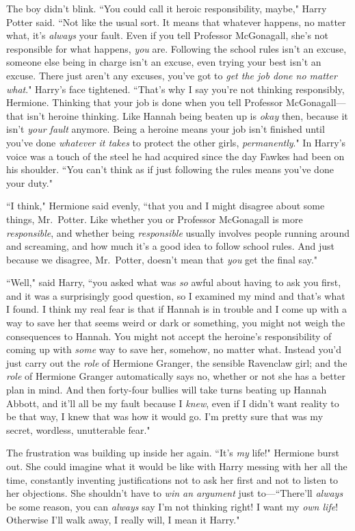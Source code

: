 The boy didn't blink. ``You could call it heroic responsibility, maybe," Harry Potter said. ``Not like the usual sort. It means that whatever happens, no matter what, it's \emph{always} your fault. Even if you tell Professor McGonagall, she's not responsible for what happens, \emph{you} are. Following the school rules isn't an excuse, someone else being in charge isn't an excuse, even trying your best isn't an excuse. There just aren't any excuses, you've got to \emph{get the job done no matter what}." Harry's face tightened. ``That's why I say you're not thinking responsibly, Hermione. Thinking that your job is done when you tell Professor McGonagall—that isn't heroine thinking. Like Hannah being beaten up is \emph{okay} then, because it isn't \emph{your fault} anymore. Being a heroine means your job isn't finished until you've done \emph{whatever it takes} to protect the other girls, \emph{permanently}." In Harry's voice was a touch of the steel he had acquired since the day Fawkes had been on his shoulder. ``You can't think as if just following the rules means you've done your duty."

``I think," Hermione said evenly, ``that you and I might disagree about some things, Mr.~Potter. Like whether you or Professor McGonagall is more \emph{responsible}, and whether being \emph{responsible} usually involves people running around and screaming, and how much it's a good idea to follow school rules. And just because we disagree, Mr.~Potter, doesn't mean that \emph{you} get the final say."

``Well," said Harry, ``you asked what was \emph{so} awful about having to ask you first, and it was a surprisingly good question, so I examined my mind and that's what I found. I think my real fear is that if Hannah is in trouble and I come up with a way to save her that seems weird or dark or something, you might not weigh the consequences to Hannah. You might not accept the heroine's responsibility of coming up with \emph{some} way to save her, somehow, no matter what. Instead you'd just carry out the \emph{role} of Hermione Granger, the sensible Ravenclaw girl; and the \emph{role} of Hermione Granger automatically says no, whether or not she has a better plan in mind. And then forty-four bullies will take turns beating up Hannah Abbott, and it'll all be my fault because I \emph{knew}, even if I didn't want reality to be that way, I knew that was how it would go. I'm pretty sure that was my secret, wordless, unutterable fear."

The frustration was building up inside her again. ``It's \emph{my} life!" Hermione burst out. She could imagine what it would be like with Harry messing with her all the time, constantly inventing justifications not to ask her first and not to listen to her objections. She shouldn't have to \emph{win an argument} just to—``There'll \emph{always} be some reason, you can \emph{always} say I'm not thinking right! I want my \emph{own life}! Otherwise I'll walk away, I really will, I mean it Harry."

